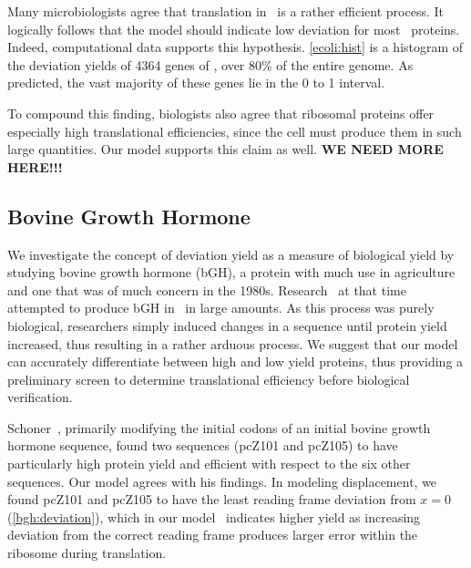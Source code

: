 \documentclass[12pt, draft]{article}
\numberwithin{equation}{section}
\begin{document}
Many microbiologists agree that translation in \ecoli\ is a rather efficient
process.  It logically follows that the model should indicate low deviation
for most \ecoli\ proteins.  Indeed, computational data supports this hypothesis.
\autoref{ecoli:hist} is a histogram of the deviation yields of 4364 genes of
\ecoli, over 80\% of the entire genome.  As predicted, the vast majority
of these genes lie in the 0 to 1 interval.

To compound this finding, biologists also agree that ribosomal proteins
offer especially high translational efficiencies, since the cell must produce
them in such large quantities.  Our model supports this claim as well.
{\textbf{WE NEED MORE HERE!!!}}

\subsection{Bovine Growth Hormone}
\label{section:bgh}


We investigate the concept of deviation yield as a measure of biological
yield by studying bovine growth hormone (bGH), a protein with much use in agriculture
and one that was of much concern in the 1980s.
Research~\cite{schoner:bgh} at that time attempted to produce bGH
in \ecoli\ in large amounts.  As this process was purely biological, researchers
simply induced changes in a sequence until protein yield increased, thus resulting
in a rather arduous process.  We suggest that our model can accurately
differentiate between high and low yield proteins, thus providing a preliminary screen
to determine translational efficiency before biological verification.

Schoner~\cite{schoner:bgh}, primarily modifying the initial codons of an initial
bovine growth hormone sequence, found two sequences (pcZ101 and pcZ105)
to have particularly high protein yield and efficient with respect to
the six other sequences. Our model agrees with his findings. In modeling displacement,
we found pcZ101 and pcZ105 to have the least reading frame deviation
from $x = 0$ (\autoref{bgh:deviation}), which in our model~\cite{lalit:mechanics} indicates
higher yield as increasing deviation from the correct reading frame
produces larger error within the ribosome during translation.
\end{document}

